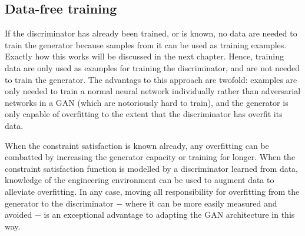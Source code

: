\documentclass[../../main.tex]{subfiles}
\begin{document}
\subsection{Data-free training} \label{subsection:dataFreeTraining}

If the discriminator has already been trained, or is known, no data are needed to train the generator because samples from it can be used as training examples.
Exactly how this works will be discussed in the next chapter.
Hence, training data are only used as examples for training the discriminator, and are not needed to train the generator.
The advantags to this approach are twofold: examples are only needed to train a normal neural network individually rather than adversarial networks in a GAN (which are notoriously hard to train), and the generator is only capable of overfitting to the extent that the discriminator has overfit its data.

When the constraint satisfaction is known already, any overfitting can be combatted by increasing the generator capacity or training for longer.
When the constraint satisfaction function is modelled by a discriminator learned from data, knowledge of the engineering environment can be used to augment data to alleviate overfitting.
In any case, moving all responsibility for overfitting from the generator to the discriminator $-$ where it can be more easily measured and avoided $-$ is an exceptional advantage to adapting the GAN architecture in this way.
\end{document}
